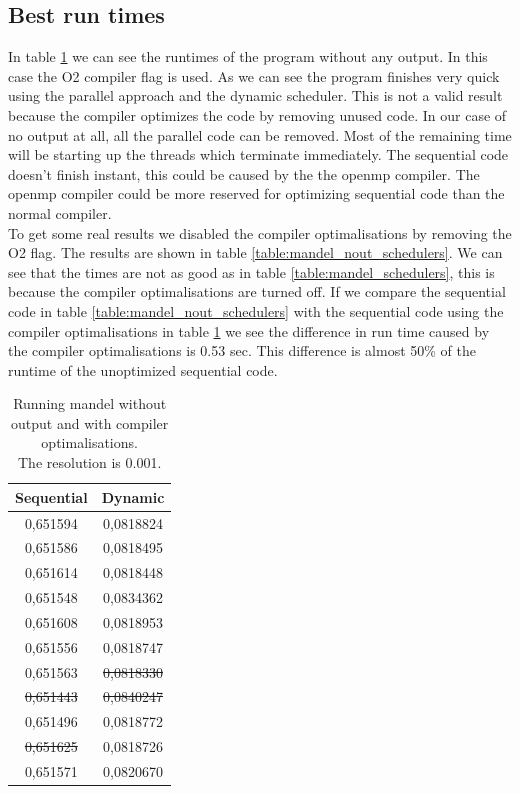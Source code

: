 \documentclass[a4paper]{article}
\begin{document}
\subsection{Best run times}
	In table \ref{table:mandel_nout_o3} we can see the runtimes of the program without any output.
	In this case the O2 compiler flag is used.
	As we can see the program finishes very quick using the parallel approach and the dynamic scheduler.
	This is not a valid result because the compiler optimizes the code by removing unused code.
	In our case of no output at all, all the parallel code can be removed.
	Most of the remaining time will be starting up the threads which terminate immediately.
	The sequential code doesn't finish instant, this could be caused by the the openmp compiler.
	The openmp compiler could be more reserved for optimizing sequential code than the normal compiler.\\
	To get some real results we disabled the compiler optimalisations by removing the O2 flag.
	The results are shown in table \ref{table:mandel_nout_schedulers}.
	We can see that the times are not as good as in table \ref{table:mandel_schedulers}, this is because the compiler optimalisations are turned off.
	If we compare the sequential code in table \ref{table:mandel_nout_schedulers} with the sequential code using the compiler optimalisations in table \ref{table:mandel_nout_o3}
	we see the difference in run time caused by the compiler optimalisations is 0.53 sec.
	This difference is almost 50\% of the runtime of the unoptimized sequential code.\\
	
	\begin{table}[h]
		\caption{Running mandel without output and with compiler optimalisations.\\The resolution is 0.001.}
		\label{table:mandel_nout_o3}
		\begin{center}
			\begin{tabular}{| c | c |}
				\hline
				Sequential & Dynamic\\ 
				\hline
				0,651594 & 0,0818824\\ 
				0,651586 & 0,0818495\\ 
				0,651614 & 0,0818448\\ 
				0,651548 & 0,0834362\\ 
				0,651608 & 0,0818953\\ 
				0,651556 & 0,0818747\\ 
				0,651563 & \st{0,0818330}\\ 
				\st{0,651443} & \st{0,0840247}\\ 
				0,651496 & 0,0818772\\ 
				\st{0,651625} & 0,0818726\\ 
				\hline
				0,651571 & 0,0820670\\ 
				\hline
			\end{tabular}
		\end{center}
	\end{table}
	
\end{document}
